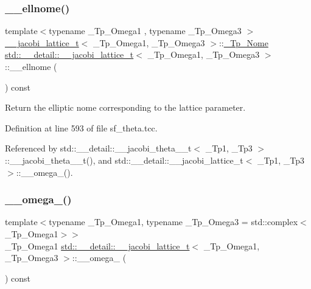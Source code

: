 \subsubsection{\texorpdfstring{\+\_\+\+\_\+ellnome()}{\_\_ellnome()}}
{\footnotesize\ttfamily template$<$typename \+\_\+\+Tp\+\_\+\+Omega1 , typename \+\_\+\+Tp\+\_\+\+Omega3 $>$ \\
\hyperlink{structstd_1_1____detail_1_1____jacobi__lattice__t}{\+\_\+\+\_\+jacobi\+\_\+lattice\+\_\+t}$<$ \+\_\+\+Tp\+\_\+\+Omega1, \+\_\+\+Tp\+\_\+\+Omega3 $>$\+::\hyperlink{structstd_1_1____detail_1_1____jacobi__lattice__t_a0de534a75abb780f607e9d3cd8b84e42}{\+\_\+\+Tp\+\_\+\+Nome} \hyperlink{structstd_1_1____detail_1_1____jacobi__lattice__t}{std\+::\+\_\+\+\_\+detail\+::\+\_\+\+\_\+jacobi\+\_\+lattice\+\_\+t}$<$ \+\_\+\+Tp\+\_\+\+Omega1, \+\_\+\+Tp\+\_\+\+Omega3 $>$\+::\+\_\+\+\_\+ellnome (\begin{DoxyParamCaption}{ }\end{DoxyParamCaption}) const}

Return the elliptic nome corresponding to the lattice parameter. 

Definition at line 593 of file sf\+\_\+theta.\+tcc.



Referenced by std\+::\+\_\+\+\_\+detail\+::\+\_\+\+\_\+jacobi\+\_\+theta\+\_\+\_\+t$<$ \+\_\+\+Tp1, \+\_\+\+Tp3 $>$\+::\+\_\+\+\_\+jacobi\+\_\+theta\+\_\+\_\+t(), and std\+::\+\_\+\+\_\+detail\+::\+\_\+\+\_\+jacobi\+\_\+lattice\+\_\+t$<$ \+\_\+\+Tp1, \+\_\+\+Tp3 $>$\+::\+\_\+\+\_\+omega\+\_().

\mbox{\label{structstd_1_1____detail_1_1____jacobi__lattice__t_afabed4a35ae12b4631138b3dc9ceec6a}} 
\subsubsection{\texorpdfstring{\+\_\+\+\_\+omega\+\_()}{\_\_omega\_1()}}
{\footnotesize\ttfamily template$<$typename \+\_\+\+Tp\+\_\+\+Omega1, typename \+\_\+\+Tp\+\_\+\+Omega3 = std\+::complex$<$\+\_\+\+Tp\+\_\+\+Omega1$>$$>$ \\
\+\_\+\+Tp\+\_\+\+Omega1 \hyperlink{structstd_1_1____detail_1_1____jacobi__lattice__t}{std\+::\+\_\+\+\_\+detail\+::\+\_\+\+\_\+jacobi\+\_\+lattice\+\_\+t}$<$ \+\_\+\+Tp\+\_\+\+Omega1, \+\_\+\+Tp\+\_\+\+Omega3 $>$\+::\+\_\+\+\_\+omega\+\_ (\begin{DoxyParamCaption}{ }\end{DoxyParamCaption}) const\hspace{0.3cm}{\ttfamily [inline]}}



